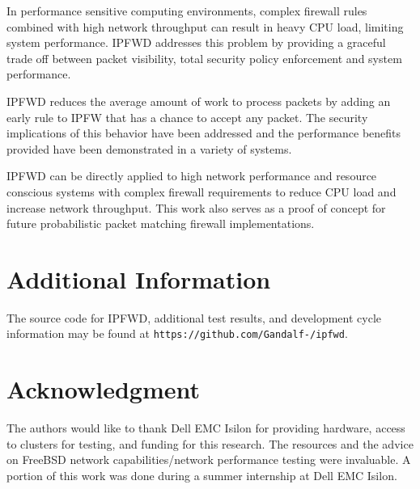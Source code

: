 \documentclass[journal]{IEEEtran}
\begin{document}
  In performance sensitive computing environments, complex firewall rules
  combined with high network throughput can result in heavy CPU load, limiting
  system performance. IPFWD addresses this problem by providing a graceful
  trade off between packet visibility, total security policy enforcement and
  system performance.

  IPFWD reduces the average amount of work to process packets by adding an
  early rule to IPFW that has a chance to accept any packet. The security
  implications of this behavior have been addressed and the performance
  benefits provided have been demonstrated in a variety of systems.

  IPFWD can be directly applied to high network performance and resource
  conscious systems with complex firewall requirements to reduce CPU load and
  increase network throughput. This work also serves as a proof of concept for
  future probabilistic packet matching firewall implementations.


\appendices
\section{Additional Information}
  The source code for IPFWD, additional test results, and development cycle
  information may be found at \texttt{https://github.com/Gandalf-/ipfwd}.


\section*{Acknowledgment} 

The authors would like to thank Dell EMC Isilon for providing hardware, access
to clusters for testing, and funding for this research. The
resources and the advice on FreeBSD network capabilities/network performance
testing were invaluable. A portion of this work was done during a summer
internship at Dell EMC Isilon.


\ifCLASSOPTIONcaptionsoff
  \newpage
\fi


\printbibliography

\end{document}
